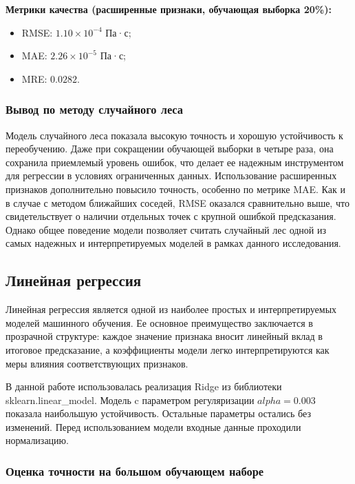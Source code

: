 \documentclass[a4paper,12pt]{article}
\begin{document}
    \vspace{5mm}
    \begin{minipage}{\textwidth}
      \textbf{Метрики качества (расширенные признаки, обучающая выборка 20\%):}
      \begin{itemize}
          \item RMSE: \( 1.10 \times 10^{-4} \) Па·с;
          \item MAE: \( 2.26 \times 10^{-5} \) Па·с;
          \item MRE: \( 0.0282 \).
      \end{itemize}
    \end{minipage}
    
    \subsubsection{Вывод по методу случайного леса}
    
    Модель случайного леса показала высокую точность и хорошую устойчивость к переобучению. Даже при сокращении обучающей выборки в четыре раза, она сохранила приемлемый уровень ошибок, что делает ее надежным инструментом для регрессии в условиях ограниченных данных. Использование расширенных признаков дополнительно повысило точность, особенно по метрике MAE. Как и в случае с методом ближайших соседей, RMSE оказался сравнительно выше, что свидетельствует о наличии отдельных точек с крупной ошибкой предсказания. Однако общее поведение модели позволяет считать случайный лес одной из самых надежных и интерпретируемых моделей в рамках данного исследования.

  \subsection{Линейная регрессия}

    Линейная регрессия является одной из наиболее простых и интерпретируемых моделей машинного обучения. Ее основное преимущество заключается в прозрачной структуре: каждое значение признака вносит линейный вклад в итоговое предсказание, а коэффициенты модели легко интерпретируются как меры влияния соответствующих признаков.

    В данной работе использовалась реализация Ridge из библиотеки sklearn.linear\_model. Модель c параметром регуляризации \( alpha = 0.003 \) показала наибольшую устойчивость. Остальные параметры остались без изменений. Перед использованием модели входные данные проходили нормализацию.
    
    \subsubsection{Оценка точности на большом обучающем наборе}
    
\end{document}
